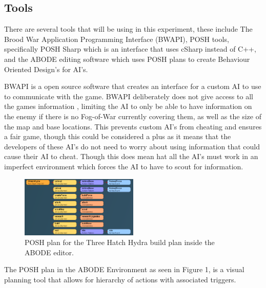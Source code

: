 \documentclass[journal]{IEEEtran}
\begin{document}
\subsection{Tools}
There are several tools that will be using in this experiment, these include The Brood War Application Programming Interface (BWAPI), POSH tools, specifically POSH Sharp which is an interface that uses cSharp instead of C++, and the ABODE editing software which uses POSH plans to create Behaviour Oriented Design's for AI's. 

BWAPI \cite{BWAPI} is a open source software that creates an interface for a custom AI to use to communicate with the game. BWAPI deliberately does not give access to all the games information \cite{POSH}, limiting the AI to only be able to have information on the enemy if there is no Fog-of-War currently covering them, as well as the size of the map and base locations. This prevents custom AI's from cheating and ensures a fair game, though this could be considered a plus as it means that the developers of these AI's do not need to worry about using information that could cause their AI to cheat. Though this does mean hat all the AI's must work in an imperfect environment which forces the AI to have to scout for information.

\begin{figure}[h]
	\centering
	\includegraphics[width=0.5\textwidth]{POSH}
	\caption{POSH plan for the Three Hatch Hydra build plan inside the ABODE editor.}
	\label{Fig1}
\end{figure}

The POSH plan in the ABODE Environment as seen in Figure 1, is a visual planning tool that allows for hierarchy of actions with associated triggers. 
\end{document}
